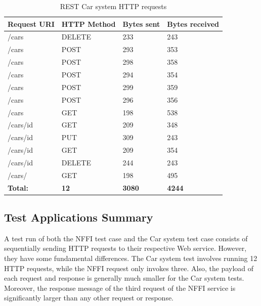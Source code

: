 \begin{table}[h]
\begin{tabular}{|l|l|l|l|}
\hline
\textbf{Request URI} & \textbf{HTTP Method} & \textbf{Bytes sent} & \textbf{Bytes received} \\ \hline
/cars                   & DELETE                  & 233                 & 243           \\ \hline
/cars                   & POST                  & 293                 & 353           \\ \hline
/cars                    & POST                 & 298                 & 358           \\ \hline
/cars                    & POST                 & 294                 & 354           \\ \hline
/cars                    & POST                 & 299                 & 359           \\ \hline
/cars                    & POST                 & 296                 & 356           \\ \hline
/cars                    & GET                 & 198                 & 538           \\ \hline
/cars/{id}                    & GET                 & 209                 & 348           \\ \hline
/cars/{id}                    & PUT                 & 309                 & 243           \\ \hline
/cars/{id}                   & GET                 & 209                 & 354           \\ \hline
/cars/{id}                   & DELETE                 & 244                 & 243           \\ \hline
/cars/                   & GET                 & 198                 & 495           \\ \hline
\textbf{Total:}       & \textbf{12}               & \textbf{3080}                & \textbf{4244}          \\ \hline
\end{tabular}
\caption{REST Car system HTTP requests}
\label{table:car-requests}
\end{table}


\subsection{Test Applications Summary}

A test run of both the NFFI test case and the Car system test case consists of
sequentially sending HTTP requests to their respective Web service. However,
they have some fundamental differences. The Car system test involves running 12
HTTP requests, while the NFFI request only invokes three. Also, the payload of
each request and response is generally much smaller for the Car system tests.
Moreover, the response message of the third request of the NFFI service is
significantly larger than any other request or response.


